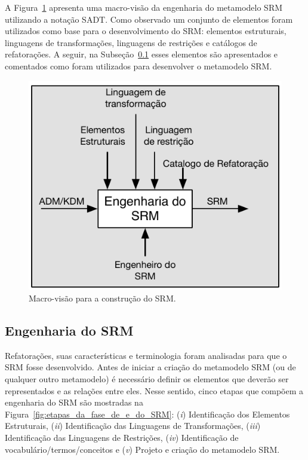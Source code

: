 A Figura~\ref{fig:fases_para_a_construcao_e_uso_do_SRM} apresenta uma macro-visão da engenharia do metamodelo SRM utilizando a notação SADT. Como observado um conjunto de elementos foram utilizados como base para o desenvolvimento do SRM: elementos estruturais, linguagens de transformações, linguagens de restrições e catálogos de refatorações. A seguir, na Subseção~\ref{Engenharia_do_Meta_modelo_SRM} esses elementos são apresentados e comentados como foram utilizados para desenvolver o metamodelo SRM.

\begin{figure}[h]
	\centering
	\caption{Macro-visão para a construção do SRM.}
	\label{fig:fases_para_a_construcao_e_uso_do_SRM}
	\includegraphics[scale=0.9]{images/SRM_Construcao2}
	\fautor
\end{figure}

\subsection{Engenharia do SRM}\label{Engenharia_do_Meta_modelo_SRM}

Refatorações, suas características e terminologia foram analisadas para que o SRM fosse desenvolvido. Antes de iniciar a criação do metamodelo SRM (ou de qualquer outro metamodelo) é necessário definir os elementos que deverão ser representados e as relações entre eles. Nesse sentido, cinco etapas que compõem a engenharia do SRM são mostradas na Figura~\ref{fig:etapas_da_fase_de_e_do_SRM}: (\textit{i}) Identificação dos Elementos Estruturais, (\textit{ii}) Identificação das Linguagens de Transformações, (\textit{iii}) Identificação das Linguagens de Restrições, (\textit{iv}) Identificação de vocabulário/termos/conceitos e (\textit{v}) Projeto e criação do metamodelo SRM. 

